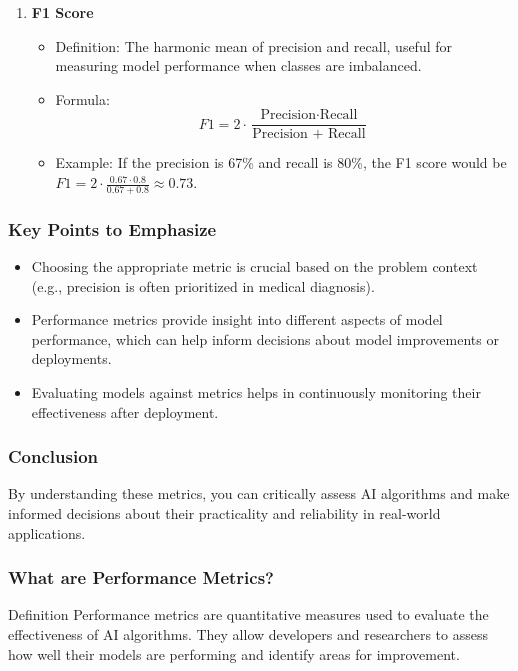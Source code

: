 \documentclass[aspectratio=169]{beamer}
\begin{document}
\begin{frame}[fragile]
\begin{enumerate}
        \item \textbf{F1 Score}
        \begin{itemize}
            \item Definition: The harmonic mean of precision and recall, useful for measuring model performance when classes are imbalanced.
            \item Formula:
            \begin{equation}
                F1 = 2 \cdot \frac{\text{Precision} \cdot \text{Recall}}{\text{Precision + Recall}}
            \end{equation}
            \item Example: If the precision is 67\% and recall is 80\%, the F1 score would be \( F1 = 2 \cdot \frac{0.67 \cdot 0.8}{0.67 + 0.8} \approx 0.73\).
        \end{itemize}
    \end{enumerate}
\end{frame}

\begin{frame}[fragile]
    \frametitle{Key Points to Emphasize}
    \begin{itemize}
        \item Choosing the appropriate metric is crucial based on the problem context (e.g., precision is often prioritized in medical diagnosis).
        \item Performance metrics provide insight into different aspects of model performance, which can help inform decisions about model improvements or deployments.
        \item Evaluating models against metrics helps in continuously monitoring their effectiveness after deployment.
    \end{itemize}
\end{frame}

\begin{frame}[fragile]
    \frametitle{Conclusion}
    By understanding these metrics, you can critically assess AI algorithms and make informed decisions about their practicality and reliability in real-world applications.
\end{frame}

\begin{frame}[fragile]
    \frametitle{What are Performance Metrics?}
    \begin{block}{Definition}
        Performance metrics are quantitative measures used to evaluate the effectiveness of AI algorithms. They allow developers and researchers to assess how well their models are performing and identify areas for improvement.
    \end{block}
\end{frame}
\end{document}
